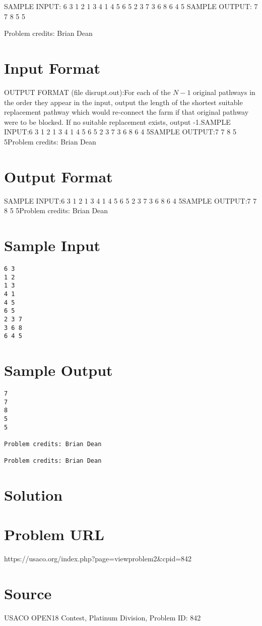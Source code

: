 \documentclass[12pt]{article}
\begin{document}
SAMPLE INPUT:
6 3
1 2
1 3
4 1
4 5
6 5
2 3 7
3 6 8
6 4 5
SAMPLE OUTPUT: 
7
7
8
5
5


Problem credits: Brian Dean



\section*{Input Format}
OUTPUT FORMAT (file disrupt.out):For each of the $N-1$ original pathways in the order they appear in the input,
output the length of the shortest suitable replacement pathway which would 
re-connect the farm if that original pathway were to be blocked.  If no suitable
replacement exists, output -1.SAMPLE INPUT:6 3
1 2
1 3
4 1
4 5
6 5
2 3 7
3 6 8
6 4 5SAMPLE OUTPUT:7
7
8
5
5Problem credits: Brian Dean

\section*{Output Format}
SAMPLE INPUT:6 3
1 2
1 3
4 1
4 5
6 5
2 3 7
3 6 8
6 4 5SAMPLE OUTPUT:7
7
8
5
5Problem credits: Brian Dean

\section*{Sample Input}
\begin{verbatim}
6 3
1 2
1 3
4 1
4 5
6 5
2 3 7
3 6 8
6 4 5
\end{verbatim}

\section*{Sample Output}
\begin{verbatim}
7
7
8
5
5

Problem credits: Brian Dean

Problem credits: Brian Dean
\end{verbatim}

\section*{Solution}


\section*{Problem URL}
https://usaco.org/index.php?page=viewproblem2&cpid=842

\section*{Source}
USACO OPEN18 Contest, Platinum Division, Problem ID: 842
\end{document}
